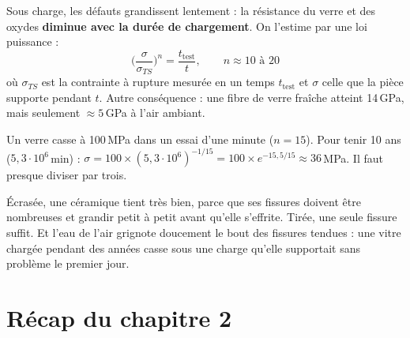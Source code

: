 \begin{propbox}[title=Conséquence : la résistance dépend du temps]
Sous charge, les défauts grandissent lentement : la résistance du verre et des oxydes
\textbf{diminue avec la durée de chargement}. On l'estime par une loi puissance :
\[ \Big(\frac{\sigma}{\sigma_{TS}}\Big)^n = \frac{t_{\text{test}}}{t}, \qquad n \approx 10 \text{ à } 20 \]
où $\sigma_{TS}$ est la contrainte à rupture mesurée en un temps $t_{\text{test}}$ et $\sigma$
celle que la pièce supporte pendant $t$. Autre conséquence : une fibre de verre fraîche atteint
14\,GPa, mais seulement $\approx 5$\,GPa à l'air ambiant.
\end{propbox}

\begin{exbox}[title={Exemple chiffré (pas dans les diapositives)}]
Un verre casse à 100\,MPa dans un essai d'une minute ($n = 15$). Pour tenir 10 ans
($5{,}3\cdot10^6$\,min) : $\sigma = 100\times(5{,}3\cdot10^6)^{-1/15} = 100\times e^{-15{,}5/15}
\approx 36$\,MPa. Il faut presque diviser par trois.
\end{exbox}

\begin{goatbox}
Écrasée, une céramique tient très bien, parce que ses fissures doivent être nombreuses et
grandir petit à petit avant qu'elle s'effrite. Tirée, une seule fissure suffit. Et l'eau de l'air
grignote doucement le bout des fissures tendues : une vitre chargée pendant des années casse
sous une charge qu'elle supportait sans problème le premier jour.
\end{goatbox}

\section*{Récap du chapitre 2}

